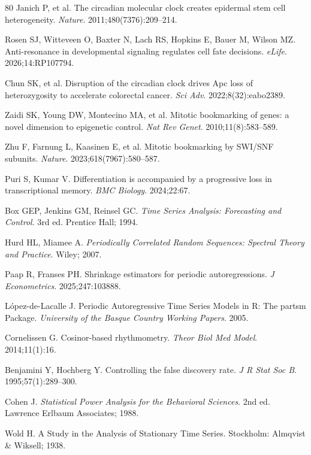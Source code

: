 \documentclass[11pt,a4paper]{article}
\begin{document}
\begin{thebibliography}{80}
Janich P, et al. The circadian molecular clock creates epidermal stem cell heterogeneity. \textit{Nature}. 2011;480(7376):209--214.

Rosen SJ, Witteveen O, Baxter N, Lach RS, Hopkins E, Bauer M, Wilson MZ. Anti-resonance in developmental signaling regulates cell fate decisions. \textit{eLife}. 2026;14:RP107794.

Chun SK, et al. Disruption of the circadian clock drives Apc loss of heterozygosity to accelerate colorectal cancer. \textit{Sci Adv}. 2022;8(32):eabo2389.

Zaidi SK, Young DW, Montecino MA, et al. Mitotic bookmarking of genes: a novel dimension to epigenetic control. \textit{Nat Rev Genet}. 2010;11(8):583--589.

Zhu F, Farnung L, Kaasinen E, et al. Mitotic bookmarking by SWI/SNF subunits. \textit{Nature}. 2023;618(7967):580--587.

Puri S, Kumar V. Differentiation is accompanied by a progressive loss in transcriptional memory. \textit{BMC Biology}. 2024;22:67.

Box GEP, Jenkins GM, Reinsel GC. \textit{Time Series Analysis: Forecasting and Control}. 3rd ed. Prentice Hall; 1994.

Hurd HL, Miamee A. \textit{Periodically Correlated Random Sequences: Spectral Theory and Practice}. Wiley; 2007.

Paap R, Franses PH. Shrinkage estimators for periodic autoregressions. \textit{J Econometrics}. 2025;247:103888.

L\'opez-de-Lacalle J. Periodic Autoregressive Time Series Models in R: The partsm Package. \textit{University of the Basque Country Working Papers}. 2005.

Cornelissen G. Cosinor-based rhythmometry. \textit{Theor Biol Med Model}. 2014;11(1):16.

Benjamini Y, Hochberg Y. Controlling the false discovery rate. \textit{J R Stat Soc B}. 1995;57(1):289--300.

Cohen J. \textit{Statistical Power Analysis for the Behavioral Sciences}. 2nd ed. Lawrence Erlbaum Associates; 1988.

Wold H. A Study in the Analysis of Stationary Time Series. Stockholm: Almqvist \& Wiksell; 1938.


\end{thebibliography}
\end{document}
